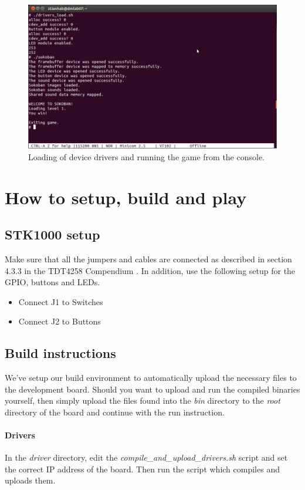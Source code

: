 \documentclass[a4paper,11pt]{article}
\begin{document}
\begin{figure}[H]
\centering
\includegraphics[scale=0.4]{images/consolestart.png}
\caption{Loading of device drivers and running the game from the console.}
\label{fig:consolestart}
\end{figure}

\section{How to setup, build and play}
\subsection{STK1000 setup}
Make sure that all the jumpers and cables are connected as described in section 4.3.3 in the TDT4258 Compendium \cite{komp}.
In addition, use the following setup for the GPIO, buttons and LEDs.

\begin{itemize}
\item Connect J1 to Switches
\item Connect J2 to Buttons
\end{itemize}

\subsection{Build instructions}
We've setup our build environment to automatically upload the necessary files to the development board. Should you want to upload and run the compiled binaries yourself, then simply upload the files found into the \textit{bin} directory to the \textit{root} directory of the board and continue with the run instruction.

\paragraph{Drivers}
In the \textit{driver} directory, edit the \textit{compile\_and\_upload\_drivers.sh} script and set the correct IP address of the board. Then run the script which compiles and uploads them.
\end{document}
